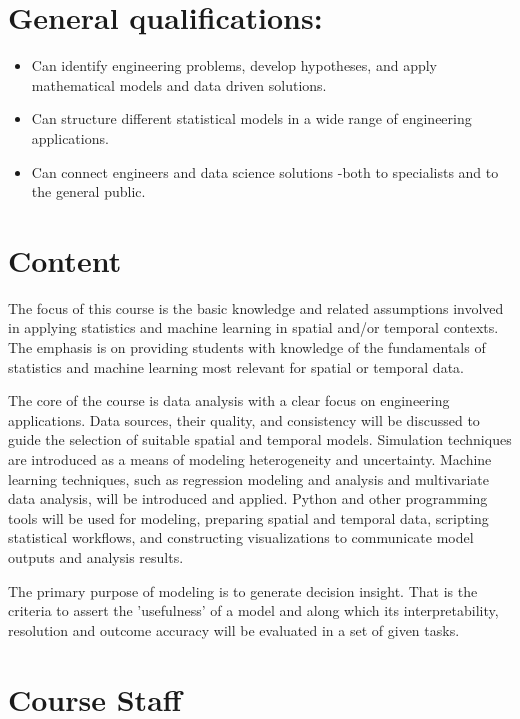 \documentclass[letterpaper,12pt,oneside]{article}
\begin{document}
\section*{General qualifications:}

\begin{itemize}
\item Can identify engineering problems, develop hypotheses, and apply mathematical models and data driven solutions.
\item Can structure different statistical models in a wide range of engineering applications.
\item Can connect engineers and data science solutions -both to specialists and to the general public.

\end{itemize}



\section*{Content}


The focus of this course is the basic knowledge and related assumptions involved in applying statistics and machine learning in spatial and/or temporal contexts. The emphasis is on providing students with knowledge of the fundamentals of statistics and machine learning most relevant for spatial or temporal data. 

The core of the course is data analysis with a clear focus on engineering applications. Data sources, their quality, and consistency will be discussed to guide the selection of suitable spatial and temporal models. Simulation techniques are introduced as a means of modeling heterogeneity and uncertainty. Machine learning techniques, such as regression modeling and analysis and multivariate data analysis, will be introduced and applied. Python and other programming tools will be used for modeling, preparing spatial and temporal data, scripting statistical workflows, and constructing visualizations to communicate model outputs and analysis results. 

The primary purpose of modeling is to generate decision insight. That is the criteria to assert the 'usefulness’ of a model and along which its interpretability, resolution and outcome accuracy will be evaluated in a set of given tasks. 




\section*{Course Staff}
\end{document}
